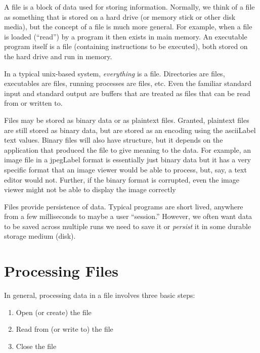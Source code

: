 

A \gls{file} is a block of data used for storing information.
Normally, we think of a file as something that is stored on 
a hard drive (or memory stick or other disk media), but the
concept of a file is much more general.  For example, when
a file is loaded (``read'') by a program it then exists in 
main memory.  An executable program itself is a file 
(containing instructions to be executed), both stored on 
the hard drive and run in memory.

In a typical unix-based system, \emph{everything} is a
file.  Directories are files, executables are files, 
running processes are files, etc.  Even the familiar 
standard input and standard output are buffers that
are treated as files that can be read from or written to.

Files may be stored as binary data or as plaintext files.
Granted, plaintext files are still stored as binary data, 
but are stored as an encoding using the \gls{asciiLabel}
text values.  Binary files will also have structure, but
it depends on the application that produced the file to
give meaning to the data.  For example, an image file
in a \gls{jpegLabel} format is essentially just binary
data but it has a very specific format that an
image viewer would be able to process, but, say, a text
editor would not.  Further, if the binary format is
corrupted, even the image viewer might not be able to
display the image correctly

Files provide \gls{persistence} of data.  Typical programs
are short lived, anywhere from a few milliseconds to maybe
a user ``session.''  However, we often want data to be
saved across multiple runs we need to save it or \emph{persist}
it in some durable storage medium (disk).  

\section{Processing Files}

In general, processing data in a file involves three basic
steps:
\begin{enumerate}
  \item Open (or create) the file
  \item Read from (or write to) the file
  \item Close the file
\end{enumerate}

